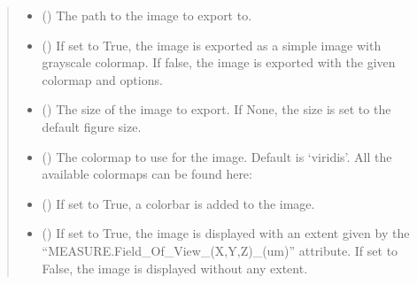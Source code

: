 \documentclass[letterpaper,10pt,english]{sphinxmanual}
\begin{document}
\begin{fulllineitems}
\begin{fulllineitems}
\begin{quote}
\begin{description}
\begin{itemize}
\item {} 
\sphinxAtStartPar
{} () \textendash{} The path to the image to export to.

\item {} 
\sphinxAtStartPar
{} (\sphinxstyleliteralemphasis{\sphinxupquote{, }}) \textendash{} If set to True, the image is exported as a simple image with grayscale colormap. If false, the image is exported with the given colormap and options.

\item {} 
\sphinxAtStartPar
{} (\sphinxstyleliteralemphasis{\sphinxupquote{, }}) \textendash{} The size of the image to export. If None, the size is set to the default figure size.

\item {} 
\sphinxAtStartPar
{} (\sphinxstyleliteralemphasis{\sphinxupquote{, }}) \textendash{} The colormap to use for the image. Default is ‘viridis’. All the available colormaps can be found here: 

\item {} 
\sphinxAtStartPar
{} (\sphinxstyleliteralemphasis{\sphinxupquote{, }}) \textendash{} If set to True, a colorbar is added to the image.

\item {} 
\sphinxAtStartPar
{} (\sphinxstyleliteralemphasis{\sphinxupquote{, }}) \textendash{} If set to True, the image is displayed with an extent given by the “MEASURE.Field\_Of\_View\_(X,Y,Z)\_(um)” attribute. If set to False, the image is displayed without any extent.

\end{itemize}


\end{description}
\end{quote}
\end{fulllineitems}
\end{fulllineitems}
\end{document}
